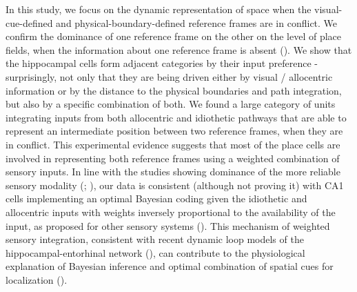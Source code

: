 \documentclass[twoside, 12pt,  footinclude=true,  headinclude=true,  cleardoublepage=empty]{scrbook}
\begin{document}
In this study, we focus on the dynamic representation of space when the visual-cue-defined and physical-boundary-defined reference frames are in conflict. We confirm the dominance of one reference frame on the other on the level of place fields, when the information about one reference frame is absent (\cite{Gothard2001}). We show that the hippocampal cells form adjacent categories by their input preference - surprisingly, not only that they are being driven either by visual / allocentric information or by the distance to the physical boundaries and path integration, but also by a specific combination of both. We found a large category of units integrating inputs from both allocentric and idiothetic pathways that are able to represent an intermediate position between two reference frames, when they are in conflict. This experimental evidence suggests that most of the place cells are involved in representing both reference frames using a weighted combination of sensory inputs. In line with the studies showing dominance of the more reliable sensory modality (\cite{Jeffery1999}; \cite{Gothard2001}), our data is consistent (although not proving it) with CA1 cells implementing an optimal Bayesian coding given the idiothetic and allocentric inputs with weights inversely proportional to the availability of the input, as proposed for other sensory systems (\cite{Jeffery2016}). This mechanism of weighted sensory integration, consistent with recent dynamic loop models of the hippocampal-entorhinal network (\cite{Li2020}), can contribute to the physiological explanation of Bayesian inference and optimal combination of spatial cues for localization  (\cite{Cheng2007}).


\mainmatter









%

%

%

\printbibliography

\backmatter


\end{document}
